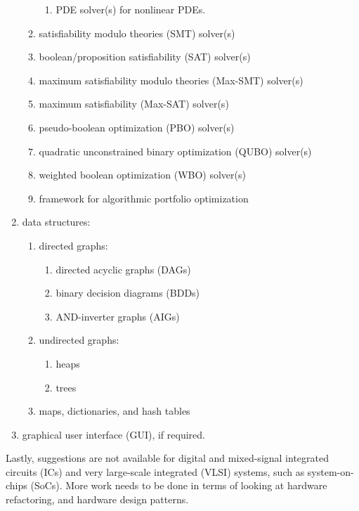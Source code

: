 \documentclass[letter,12pt]{article}
\begin{document}
\begin{enumerate}
\begin{enumerate}
		\begin{enumerate} \itemsep -2pt
		\item PDE solver(s) for nonlinear PDEs.
		\end{enumerate}
	\item satisfiability modulo theories (SMT) solver(s)
	\item boolean/proposition satisfiability (SAT) solver(s)
	\item maximum satisfiability modulo theories (Max-SMT) solver(s)
	\item maximum satisfiability (Max-SAT) solver(s)
	\item pseudo-boolean optimization (PBO) solver(s)
	\item quadratic unconstrained binary optimization (QUBO) solver(s)
	\item weighted boolean optimization (WBO) solver(s)
	\item framework for algorithmic portfolio optimization
	\end{enumerate}
\item data structures: \vspace{-0.3cm}
	\begin{enumerate} \itemsep -2pt
	\item directed graphs: \vspace{-0.2cm}
		\begin{enumerate} \itemsep -2pt
		\item directed acyclic graphs (DAGs)
		\item binary decision diagrams (BDDs)
		\item AND-inverter graphs (AIGs)
		\end{enumerate}
	\item undirected graphs: \vspace{-0.2cm}
		\begin{enumerate} \itemsep -2pt
		\item heaps
		\item trees
		\end{enumerate}
	\item maps, dictionaries, and hash tables
	\end{enumerate}
\item graphical user interface (GUI), if required.
\end{enumerate}




Lastly, suggestions are not available for digital and mixed-signal integrated circuits (ICs) and very large-scale integrated (VLSI) systems, such as system-on-chips (SoCs). More work needs to be done in terms of looking at hardware refactoring, and hardware design patterns.
\end{document}
